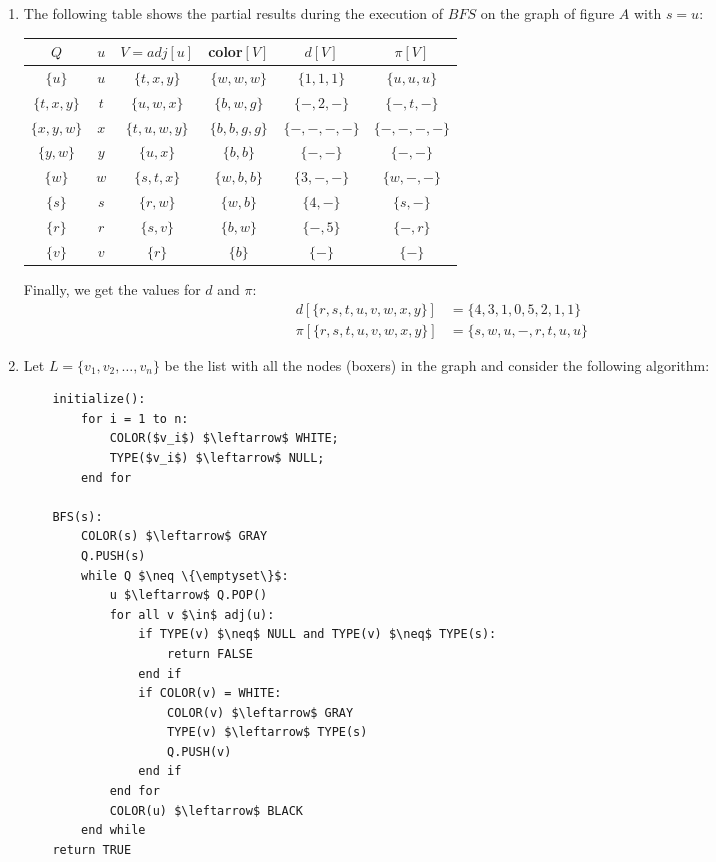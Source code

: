 \documentclass{article}
\begin{document}
\begin{enumerate}[1.]
    \item The following table shows the partial results during the execution of $BFS$ on the graph of figure $A$ with $s = u$:
    	\begin{table}[ht]
		\centering
		\begin{tabular}{cccccc}
			\toprule
			$Q$ & $u$ & $V = adj[u]$ & color$[V]$ & $d[V]$ & $\pi[V]$ \\
			\midrule
            $\{u\}$ & $u$ & $\{t,x,y\}$ & $\{w,w,w\}$ & $\{1,1,1\}$ & $\{u,u,u\}$ \\
            $\{t,x,y\}$ & $t$ & $\{u,w,x\}$ & $\{b,w,g\}$ & $\{-,2,-\}$ & $\{-,t,-\}$ \\
            $\{x,y,w\}$ & $x$ & $\{t,u,w,y\}$ & $\{b,b,g,g\}$ & $\{-,-,-,-\}$ & $\{-,-,-,-\}$ \\
            $\{y,w\}$ & $y$ & $\{u,x\}$ & $\{b,b\}$ & $\{-,-\}$ & $\{-,-\}$ \\
            $\{w\}$ & $w$ & $\{s,t,x\}$ & $\{w,b,b\}$ & $\{3,-,-\}$ & $\{w,-,-\}$ \\
            $\{s\}$ & $s$ & $\{r,w\}$ & $\{w,b\}$ & $\{4,-\}$ & $\{s,-\}$ \\
            $\{r\}$ & $r$ & $\{s,v\}$ & $\{b,w\}$ & $\{-,5\}$ & $\{-,r\}$ \\
            $\{v\}$ & $v$ & $\{r\}$ & $\{b\}$ & $\{-\}$ & $\{-\}$ \\
			\bottomrule
		\end{tabular}
    \end{table}
    
    Finally, we get the values for $d$ and $\pi$:
    \begin{align*}
        d[\{r,s,t,u,v,w,x,y\}] &= \{4,3,1,0,5,2,1,1\} \\
        \pi[\{r,s,t,u,v,w,x,y\}] &= \{s,w,u,-,r,t,u,u\}
    \end{align*}
    
    \item Let $L = \{v_1, v_2, \ldots , v_n\}$ be the list with all the nodes (boxers) in the graph and consider the following algorithm:
\begin{lstlisting}
    initialize():
        for i = 1 to n:
            COLOR($v_i$) $\leftarrow$ WHITE;
            TYPE($v_i$) $\leftarrow$ NULL;
        end for
    
    BFS(s):
        COLOR(s) $\leftarrow$ GRAY
        Q.PUSH(s)
        while Q $\neq \{\emptyset\}$:
            u $\leftarrow$ Q.POP()
            for all v $\in$ adj(u):
                if TYPE(v) $\neq$ NULL and TYPE(v) $\neq$ TYPE(s):
                    return FALSE
                end if
                if COLOR(v) = WHITE:
                    COLOR(v) $\leftarrow$ GRAY
                    TYPE(v) $\leftarrow$ TYPE(s)
                    Q.PUSH(v)
                end if
            end for
            COLOR(u) $\leftarrow$ BLACK
        end while
    return TRUE
    

\end{lstlisting}
\end{enumerate}
\end{document}
